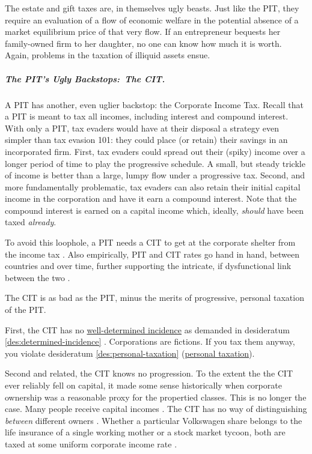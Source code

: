 The estate and gift taxes are, in themselves ugly beasts.
Just like the PIT, they require an evaluation of a flow of economic welfare in the potential absence of a market equilibrium price of that very flow.
If an entrepreneur bequests her family-owned firm to her daughter, no one can know how much it is worth.
Again, problems in the taxation of illiquid assets ensue.

\subparagraph{The PIT's Ugly Backstops:~The CIT.}
	\label{sec:ScoreCIT}
A PIT has another, even uglier backstop:
the Corporate Income Tax.
Recall that a PIT is meant to tax all incomes, including interest and compound interest.
With only a PIT, tax evaders would have at their disposal a strategy even simpler than tax evasion 101:
they could place (or retain) their savings in an incorporated firm.
First, tax evaders could spread out their (spiky) income over a longer period of time to play the progressive schedule.
A small, but steady trickle of income is better than a large, lumpy flow under a progressive tax.
Second, and more fundamentally problematic, tax evaders can also retain their initial capital income in the corporation and have it earn a compound interest.
Note that the compound interest is earned on a capital income which, ideally, \emph{should} have been taxed \emph{already}.

To avoid this loophole, a PIT needs a CIT to get at the corporate shelter from the income tax \citep[7]{Genschel2005}.
Also empirically, PIT and CIT rates go hand in hand, between countries and over time, further supporting the intricate, if dysfunctional link between the two \citep[14]{Piatkowski2008}.

The CIT is as bad as the PIT, minus the merits of progressive, personal taxation of the PIT.

First, the CIT has no \hyperref[des:determined-incidence]{well-determined incidence} as demanded in desideratum \ref{des:determined-incidence} \citep[918]{McCaffery2005}.
Corporations are fictions.
If you tax them anyway, you violate desideratum \ref{des:personal-taxation} (\hyperref[des:personal-taxation]{personal taxation}).

Second and related, the CIT knows no progression.
To the extent the the CIT ever reliably fell on capital, it made some sense historically when corporate ownership was a reasonable proxy for the propertied classes.
This is no longer the case.
Many people receive capital incomes \citep[XV]{Grabka2007a}.
The CIT has no way of distinguishing \emph{between} different owners \citep[918]{McCaffery2005}.
Whether a particular Volkswagen share belongs to the life insurance of a single working mother or a stock market tycoon, both are taxed at some uniform corporate income rate .

